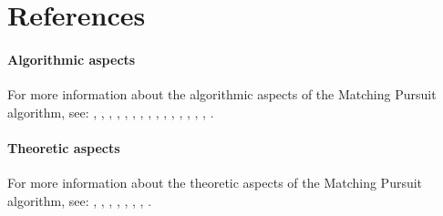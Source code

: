 \documentclass[11pt,a4paper]{article}
\begin{document}
\clearpage
\section{References}
\paragraph{Algorithmic aspects} For more information about the algorithmic
aspects of the Matching Pursuit algorithm, see: \newline \cite{Zhang93},
\cite{MZ93}, \cite{PRK93}, \cite{Davis94}, \cite{Bergeaud},
\cite{BM96}, \cite{HRP}, \cite{HRMP1}, \cite{HRMP2}, \cite{DMA97},
\cite{goodwin99:_match}, \cite{MaThese}, \cite{Grib2001}, \linebreak
\cite{Grib2002a}, \cite{gribonval03:_harmon_decom_audio_signal_match_pursuit},
\cite{SPIE03:GribA}.

\paragraph{Theoretic aspects} For more information about the theoretic aspects
of the Matching Pursuit algorithm, see: \newline
\cite{Grib2001b}, \cite{GN2001}, \cite{Grib2001c}, \cite{ICIP03:GN},
\cite{gribonval03:_spars}, \cite{IRISA03:GV}, \cite{gribonval03:_highl},
\cite{GribFig}.


{
}
\end{document}
